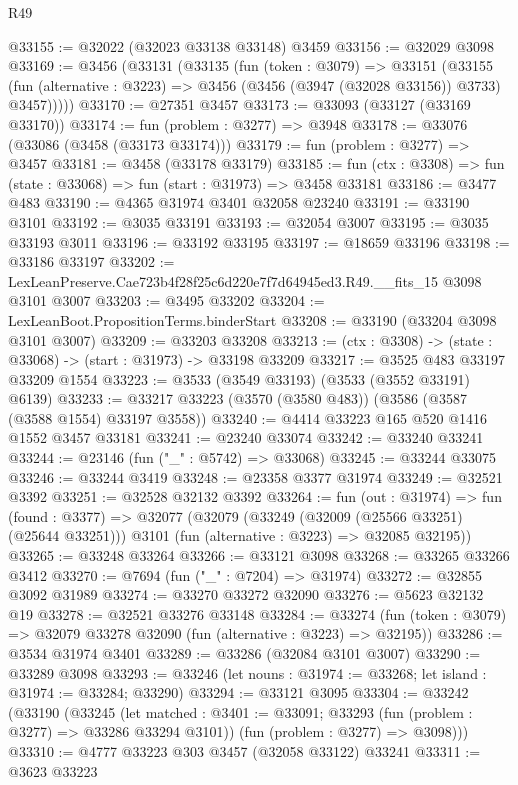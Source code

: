 \begin{lexlean}{R49}
\begin{coremodule}
@33155 := @32022 (@32023 @33138 @33148) @3459
@33156 := @32029 @3098
@33169 := @3456
    (@33131
      (@33135
        (fun (token : @3079) =>
        @33151
          (@33155
            (fun (alternative : @3223) => @3456 (@3456 (@3947 (@32028 @33156)) @3733) @3457)))))
@33170 := @27351 @3457
@33173 := @33093 (@33127 (@33169 @33170))
@33174 := fun (problem : @3277) => @3948
@33178 := @33076 (@33086 (@3458 (@33173 @33174)))
@33179 := fun (problem : @3277) => @3457
@33181 := @3458 (@33178 @33179)
@33185 := fun (ctx : @3308) => fun (state : @33068) => fun (start : @31973) => @3458 @33181
@33186 := @3477 @483
@33190 := @4365 @31974 @3401 @32058 @23240
@33191 := @33190 @3101
@33192 := @3035 @33191
@33193 := @32054 @3007
@33195 := @3035 @33193 @3011
@33196 := @33192 @33195
@33197 := @18659 @33196
@33198 := @33186 @33197
@33202 := LexLeanPreserve.Cae723b4f28f25c6d220e7f7d64945ed3.R49.__fits_15 @3098 @3101 @3007
@33203 := @3495 @33202
@33204 := LexLeanBoot.PropositionTerms.binderStart
@33208 := @33190 (@33204 @3098 @3101 @3007)
@33209 := @33203 @33208
@33213 := (ctx : @3308) -> (state : @33068) -> (start : @31973) -> @33198 @33209
@33217 := @3525 @483 @33197 @33209 @1554
@33223 := @3533 (@3549 @33193) (@3533 (@3552 @33191) @6139)
@33233 := @33217 @33223 (@3570 (@3580 @483)) (@3586 (@3587 (@3588 @1554) @33197 @3558))
@33240 := @4414 @33223 @165 @520 @1416 @1552 @3457 @33181
@33241 := @23240 @33074
@33242 := @33240 @33241
@33244 := @23146 (fun ("_" : @5742) => @33068)
@33245 := @33244 @33075
@33246 := @33244 @3419
@33248 := @23358 @3377 @31974
@33249 := @32521 @3392
@33251 := @32528 @32132 @3392
@33264 := fun (out : @31974) =>
  fun (found : @3377) =>
  @32077
    (@32079
      (@33249 (@32009 (@25566 @33251) (@25644 @33251)))
      @3101
      (fun (alternative : @3223) => @32085 @32195))
@33265 := @33248 @33264
@33266 := @33121 @3098
@33268 := @33265 @33266 @3412
@33270 := @7694 (fun ("_" : @7204) => @31974)
@33272 := @32855 @3092 @31989
@33274 := @33270 @33272 @32090
@33276 := @5623 @32132 @19
@33278 := @32521 @33276 @33148
@33284 := @33274 (fun (token : @3079) => @32079 @33278 @32090 (fun (alternative : @3223) => @32195))
@33286 := @3534 @31974 @3401
@33289 := @33286 (@32084 @3101 @3007)
@33290 := @33289 @3098
@33293 := @33246 (let nouns : @31974 := @33268; let island : @31974 := @33284; @33290)
@33294 := @33121 @3095
@33304 := @33242
    (@33190
      (@33245
        (let matched : @3401 := @33091; @33293 (fun (problem : @3277) => @33286 @33294 @3101))
        (fun (problem : @3277) => @3098)))
@33310 := @4777 @33223 @303 @3457 (@32058 @33122) @33241
@33311 := @3623 @33223

\end{coremodule}
\end{lexlean}
